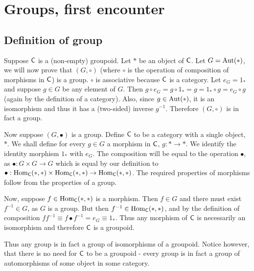 \section{Groups, first encounter}
\setcounter{subsection}{0}

\subsection{Definition of group}

\begin{problem}
\end{problem}

\begin{solution}
	Suppose $\mathsf{C}$ is a (non-empty) groupoid. Let $*$ be an object of $\mathsf{C}$. Let $G = \mathrm{Aut}(*)$, we will now prove that $(G, \circ)$ (where $\circ$ is the operation of composition of morphisms in $\mathsf{C}$) is a group. $\circ$ is associative because $\mathsf{C}$ is a category. Let $e_G = 1_*$ and suppose $g \in G$ be any element of $G$. Then $g \circ e_G = g \circ 1_* = g = 1_* \circ g = e_G \circ g$ (again by the definition of a category). Also, since $g \in \mathrm{Aut}(*)$, it is an isomorphism and thus it has a (two-sided) inverse $g^{-1}$. Therefore $(G, \circ)$ is in fact a group.
	
	Now suppose $(G, \bullet)$ is a group. Define $\mathsf{C}$ to be a category with a single object, $*$. We shall define for every $g \in G$ a morphism in $\mathsf{C}$, $g: * \to *$. We identify the identity morphism $1_*$ with $e_G$. The composition will be equal to the operation $\bullet$, as $\bullet: G \times G \to G$ which is equal by our definition to $\bullet: \mathrm{Hom}_{\mathsf{C}}(*,*) \times \mathrm{Hom}_{\mathsf{C}}(*,*) \to \mathrm{Hom}_{\mathsf{C}}(*,*)$. The required properties of morphisms follow from the properties of a group.
	
	Now, suppose $f \in \mathrm{Hom}_{\mathsf{C}}(*,*)$ is a morphism. Then $f \in G$ and there must exist $f^{-1} \in G$, as $G$ is a group. But then $f^{-1} \in \mathrm{Hom}_{\mathsf{C}}(*,*)$, and by the definition of composition $ff^{-1} \equiv f \bullet f^{-1} = e_G \equiv 1_*$. Thus any morphism of $\mathsf{C}$ is necessarily an isomorphism and therefore $\mathsf{C}$ is a groupoid.
	
	Thus any group is in fact a group of isomorphisms of a groupoid. Notice however, that there
	is no need for $\mathsf{C}$ to be a groupoid - every group is in fact a group of automorphisms of some object in some category.
\end{solution}

\begin{problem}
\end{problem}


